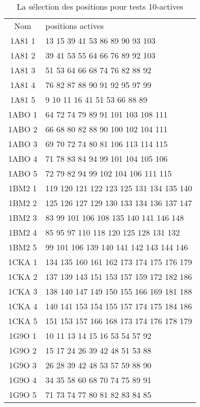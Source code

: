 \begin{table}[!htbp]
  \centering
  \caption{La sélection des positions pour tests 10-actives}  
  \begin{tabular}{cl}
      
    \toprule
    Nom & positions actives \\
    \cmidrule{1-2}
    1A81 1  & 13 15 39 41 53 86 89 90 93 103 \\
    1A81 2  & 39 41 53 55 64 66 76 89 92 103 \\
    1A81 3  & 51 53 64 66 68 74 76 82 88 92 \\
    1A81 4  & 76 82 87 88 90 91 92 95 97 99 \\
    1A81 5  & 9 10 11 16 41 51 53 66 88 89 \\
    1ABO 1  & 64 72 74 79 89 91 101 103 108 111 \\
    1ABO 2  & 66 68 80 82 88 90 100 102 104 111 \\
    1ABO 3  & 69 70 72 74 80 81 106 113 114 115 \\
    1ABO 4  & 71 78 83 84 94 99 101 104 105 106 \\
    1ABO 5  & 72 79 82 94 99 102 104 106 111 115 \\
    1BM2 1  & 119 120 121 122 123 125 131 134 135 140 \\
    1BM2 2  & 125 126 127 129 130 133 134 136 137 147 \\
    1BM2 3  & 83 99 101 106 108 135 140 141 146 148 \\
    1BM2 4  & 85 95 97 110 118 120 125 128 131 132 \\
    1BM2 5  & 99 101 106 139 140 141 142 143 144 146 \\
    1CKA 1  & 134 135 160 161 162 173 174 175 176 179 \\
    1CKA 2  & 137 139 143 151 153 157 159 172 182 186 \\
    1CKA 3  & 138 140 147 149 150 155 166 169 181 188 \\
    1CKA 4  & 140 141 153 154 155 157 174 175 184 186 \\
    1CKA 5  & 151 153 157 166 168 173 174 176 178 179 \\
    1G9O 1  & 10 11 13 14 15 16 53 54 57 92 \\
    1G9O 2  & 15 17 24 26 39 42 48 51 53 88 \\
    1G9O 3  & 26 28 39 42 48 53 57 59 88 90 \\
    1G9O 4  & 34 35 58 60 68 70 74 75 89 91 \\
    1G9O 5  & 71 73 74 77 80 81 82 83 84 85 \\

\end{tabular}
\end{table}
